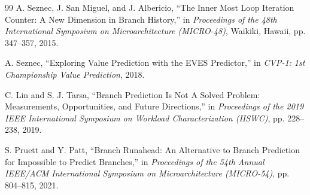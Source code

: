 \documentclass[11pt,a4paper]{article}
\begin{document}
\begin{thebibliography}{99}
A. Seznec, J. San Miguel, and J. Albericio,
``The Inner Most Loop Iteration Counter: A New Dimension in Branch History,''
in \textit{Proceedings of the 48th International Symposium on 
Microarchitecture (MICRO-48)},
Waikiki, Hawaii, pp. 347--357, 2015.

A. Seznec,
``Exploring Value Prediction with the EVES Predictor,''
in \textit{CVP-1: 1st Championship Value Prediction},
2018.

C. Lin and S. J. Tarsa,
``Branch Prediction Is Not A Solved Problem: Measurements, Opportunities, 
and Future Directions,''
in \textit{Proceedings of the 2019 IEEE International Symposium on 
Workload Characterization (IISWC)},
pp. 228--238, 2019.

S. Pruett and Y. Patt,
``Branch Runahead: An Alternative to Branch Prediction for Impossible to 
Predict Branches,''
in \textit{Proceedings of the 54th Annual IEEE/ACM International Symposium 
on Microarchitecture (MICRO-54)},
pp. 804--815, 2021.

\end{thebibliography}
\end{document}
